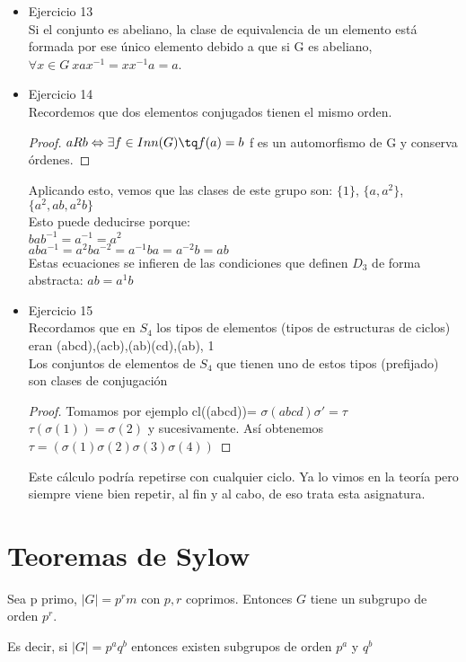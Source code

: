 \documentclass[nochap]{apuntes}
\begin{document}
\begin{itemize}
 \item Ejercicio 13\\
 Si el conjunto es abeliano, la clase de equivalencia de un elemento está formada por ese único elemento debido a que si G es abeliano,
 $\forall x \in G \ xax^{-1}=xx^{-1}a=a$.\
 
 \item Ejercicio 14\\
 Recordemos que dos elementos conjugados tienen el mismo orden.
 \begin{proof}
  $aRb \Leftrightarrow \exists f \in Inn(G) \tq f(a)=b$  f es un automorfismo de G y conserva órdenes.
 \end{proof}
 Aplicando esto, vemos que las clases de este grupo son: $\{1\}$, $\{a, a^{2}\}$, $\{a^{2}, ab, a^{2}b\}$\\
 Esto puede deducirse porque:\\
 $bab^{-1}=a^{-1}=a^{2}$\\
 $aba^{-1}=a^{2}ba^{-2}=a^{-1}ba=a^{-2}b=ab$\\
 Estas ecuaciones se infieren de las condiciones que definen $D_3$ de forma abstracta: $ab=a^{1}b$\\
 
 \item Ejercicio 15\\
 Recordamos que en $S_4$  los tipos de elementos (tipos de estructuras de ciclos) eran (abcd),(acb),(ab)(cd),(ab), 1\\
 Los conjuntos de elementos de $S_4$  que tienen uno de estos tipos (prefijado) son clases de conjugación\\
 \begin{proof}
  Tomamos por ejemplo cl((abcd))= $\sigma (abcd) \sigma'= \tau$\\
  $\tau(\sigma(1))=\sigma(2)$  y sucesivamente. Así obtenemos
  $\tau = (\sigma(1)\sigma(2)\sigma(3)\sigma(4))$
 \end{proof}

 Este cálculo podría repetirse con cualquier ciclo. Ya lo vimos en la teoría pero siempre viene bien repetir, al fin y al cabo, de eso trata esta asignatura.
\end{itemize}

\section{Teoremas de Sylow}
\begin{theorem}
 Sea p primo, $|G|=p^{r}m$  con $p, r$ coprimos. Entonces $G$ tiene un subgrupo de orden $p^{r}$.
 
 Es decir, si $|G|=p^{a}q^{b}$ entonces existen subgrupos de orden $p^{a}$  y $q^{b}$
\end{theorem}
\end{document}
